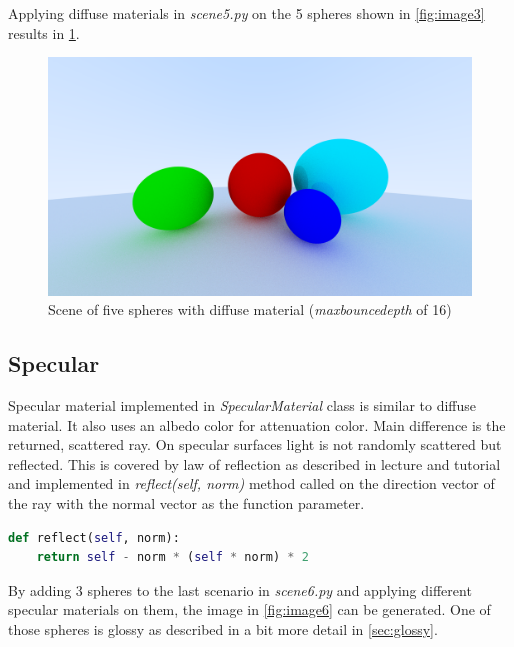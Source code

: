 \documentclass[]{article}
\begin{document}
		Applying diffuse materials in \emph{scene5.py} on the 5 spheres shown in \cref{fig:image3} results in \cref{fig:image5}.
		
		\begin{figure}[h]
			\centering
			\includegraphics[width=0.9\linewidth]{image5-5}
			\caption{Scene of five spheres with diffuse material (\emph{max\textunderscore bounce\textunderscore depth} of 16)}
			\label{fig:image5}
		\end{figure}
		 
		\subsection{Specular}
		Specular material implemented in \emph{SpecularMaterial} class is similar to diffuse material. It also uses an albedo color for attenuation color. Main difference is the returned, scattered ray. On specular surfaces light is not randomly scattered but reflected. This is covered by law of reflection as described in lecture and tutorial and implemented in \emph{reflect(self, norm)} method called on the direction vector of the ray with the normal vector as the function parameter.
		
		\begin{lstlisting}[caption={Method for reflecting a vector on a normal vector}, language=Python, label=lst:reflect]
def reflect(self, norm):
	return self - norm * (self * norm) * 2
		\end{lstlisting}
		
		By adding 3 spheres to the last scenario in \emph{scene6.py} and applying different specular materials on them, the image in \cref{fig:image6} can be generated. One of those spheres is glossy as described in a bit more detail in \cref{sec:glossy}.
		
\end{document}
